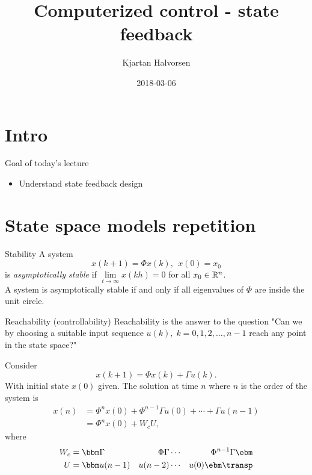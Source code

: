 \documentclass[presentation,aspectratio=1610]{beamer}
\author{Kjartan Halvorsen}
\date{2018-03-06}
\title{Computerized control - state feedback}
\begin{document}
\maketitle


\section{Intro}
\label{sec-1}

\begin{frame}[label=sec-1-1]{Goal of today's lecture}
\begin{itemize}
\item Understand state feedback design
\end{itemize}
\end{frame}

\section{State space models repetition}
\label{sec-2}

\begin{frame}[label=sec-2-1]{Stability}
A system 
\begin{equation*}
x(k+1)=\Phi x(k), \ \ x(0)=x_0
\end{equation*}
is \emph{asymptotically stable}  if  $\underset{t\to\infty}{\lim}x(kh)=0$ for all  $x_0\in\Bbb{R}^n$.\\

A system is asymptotically stable if and only if \alert{all eigenvalues of \(\Phi\) are inside the unit circle.}
\end{frame}

\begin{frame}[label=sec-2-2]{Reachability (controllability)}
Reachability is the answer to the question "Can we by choosing a suitable input sequence \(u(k),\; k=0,1,2,\ldots,n-1\) reach any point in the state space?"

Consider
\[ x(k+1) = \Phi x(k) + \Gamma u(k). \]
With initial state \(x(0)\) given. The solution at time \(n\) where \(n\) is the order of the system is
\begin{equation}
\begin{split}
x(n) &= \Phi^nx(0) + \Phi^{n-1}\Gamma u(0) + \cdots + \Gamma u(n-1)\\
     &= \Phi^nx(0) + W_c U, 
\end{split}
\end{equation}
where
\begin{align*}
W_c &= \bbm \Gamma & \Phi\Gamma & \cdots & \Phi^{n-1}\Gamma\ebm\\
U &= \bbm u(n-1) & u(n-2) & \cdots & u(0) \ebm\transp
\end{align*}
\end{frame}
\end{document}
